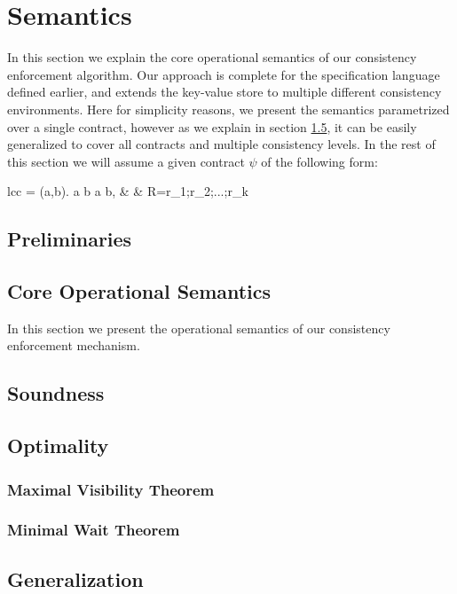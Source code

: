 %
%
\section{Semantics}

In this section we explain the core operational semantics of our
consistency enforcement algorithm. 
Our approach is complete for the specification language defined earlier,
and extends the key-value store to multiple different consistency
environments. Here for simplicity reasons, we present the semantics 
parametrized over a single contract,
however as we explain in section \ref{subsec:generalization}, it can be easily
generalized to cover all contracts and multiple consistency levels. In
the rest of this section we will assume a given contract $\psi$ of the
following form:
	\begin{smathpar}
	\begin{array}{lcc}
		\psi = \forall (a,b). a  b  \Rightarrow a
		 b, & \spc & R=r_1;r_2;...;r_k \\
	\end{array}
	\end{smathpar}

\subsection{Preliminaries}

\newpage
\subsection{Core Operational Semantics}
In this section we present the operational semantics of our consistency
enforcement mechanism.


\newpage
\subsection{Soundness}

\newpage
\subsection{Optimality}
\subsubsection{Maximal Visibility Theorem}

\subsubsection{Minimal Wait Theorem}


\subsection{Generalization}
\label{subsec:generalization}


